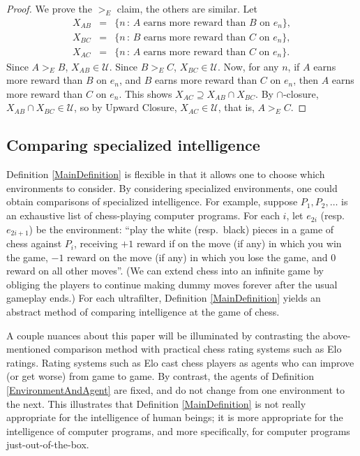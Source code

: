 \documentclass[twoside,11pt]{article}
\begin{document}
\begin{proof}
    We prove the $>_{E}$ claim, the others are similar.
    Let
    \begin{eqnarray*}
        X_{AB} &=& \{n\,:\,\mbox{$A$ earns more reward than $B$ on $e_n$}\},\\
        X_{BC} &=& \{n\,:\,\mbox{$B$ earns more reward than $C$ on $e_n$}\},\\
        X_{AC} &=& \{n\,:\,\mbox{$A$ earns more reward than $C$ on $e_n$}\}.
    \end{eqnarray*}
    Since $A>_{E}B$, $X_{AB}\in\mathscr U$.
    Since $B>_{E}C$, $X_{BC}\in\mathscr U$.
    Now, for any $n$, if $A$ earns more reward than $B$ on $e_n$,
    and $B$ earns more reward than $C$ on $e_n$,
    then $A$ earns more reward than $C$ on $e_n$.
    This shows $X_{AC}\supseteq X_{AB}\cap X_{BC}$.
    By $\cap$-closure, $X_{AB}\cap X_{BC}\in\mathscr U$,
    so by Upward Closure, $X_{AC}\in\mathscr U$, that is, $A>_{E}C$.
\end{proof}

    \subsection{Comparing specialized intelligence}

    Definition \ref{MainDefinition} is flexible in that it
    allows one to choose which environments to consider.
    By considering specialized environments, one could obtain
    comparisons of specialized intelligence. For example,
    suppose $P_1,P_2,\ldots$ is an exhaustive list of
    chess-playing computer programs. For each $i$, let $e_{2i}$
    (resp.\ $e_{2i+1}$)
    be the environment: ``play the white (resp.\ black) pieces
    in a game of chess against $P_i$, receiving $+1$ reward if
    on the move (if any) in which you win the game, $-1$ reward
    on the move (if any) in which you lose the game, and $0$
    reward on all other moves''. (We can extend chess into an
    infinite game by obliging the players to continue making
    dummy moves forever after the usual gameplay ends.)
    For each ultrafilter, Definition \ref{MainDefinition} yields
    an abstract method of comparing intelligence at the game of
    chess.

    A couple nuances about this paper will be illuminated by contrasting
    the above-mentioned comparison method with practical chess
    rating systems such as Elo ratings. Rating systems such as Elo
    cast chess players as agents who can improve (or get worse)
    from game to game. By contrast, the agents of
    Definition \ref{EnvironmentAndAgent} are fixed, and do not
    change from one environment to the next. This illustrates that
    Definition \ref{MainDefinition} is not really appropriate for
    the intelligence of human beings; it is more appropriate
    for the intelligence of computer programs, and more specifically,
    for computer programs just-out-of-the-box.
\end{document}
